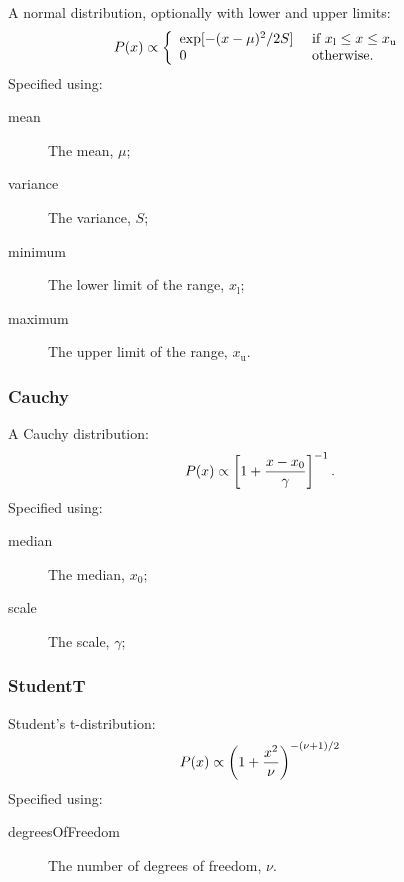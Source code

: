 A normal distribution, optionally with lower and upper limits:
\begin{equation}
P(x) \propto \left\{ \begin{array}{ll} \exp[-(x-\mu)^2/2S] & \hbox{ if } x_{\mathrm l} \leq x \leq x_{\mathrm u} \\ 0 & \hbox{ otherwise.}  \end{array} \right.
\end{equation}
Specified using:
\begin{description}
\item[{\normalfont \ttfamily mean}] The mean, $\mu$;
\item[{\normalfont \ttfamily variance}] The variance, $S$;
\item[{\normalfont \ttfamily minimum}] The lower limit of the range, $x_{\mathrm l}$;
\item[{\normalfont \ttfamily maximum}] The upper limit of the range, $x_{\mathrm u}$.
\end{description}

\subsubsection{{\normalfont \ttfamily Cauchy}}

A Cauchy distribution:
\begin{equation}
P(x) \propto \left[1+{x-x_0\over\gamma}\right]^{-1}.
\end{equation}
Specified using:
\begin{description}
\item[{\normalfont \ttfamily median}] The median, $x_0$;
\item[{\normalfont \ttfamily scale}] The scale, $\gamma$;
\end{description}

\subsubsection{{\normalfont \ttfamily StudentT}}

Student's t-distribution:
\begin{equation}
P(x) \propto \left(1 + {x^2\over \nu}\right)^{-(\nu+1)/2}
\end{equation}
Specified using:
\begin{description}
\item[{\normalfont \ttfamily degreesOfFreedom}] The number of degrees of freedom, $\nu$.
\end{description}
